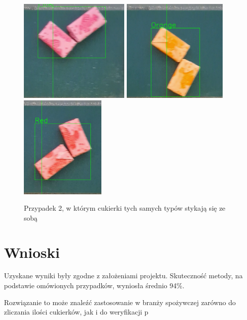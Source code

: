 \documentclass{article}
\begin{document}
\begin{center}
\begin{figure}[H]
\includegraphics[height=5cm]{pink.png}
\includegraphics[height=5cm]{orange.png}
\includegraphics[height=5cm]{red.png}
\caption{Przypadek 2, w którym cukierki tych samych typów stykają się ze sobą}
\end{figure}
\end{center}

\section{Wnioski}
\label{Wnioski}

Uzyskane wyniki były zgodne z założeniami projektu. Skuteczność metody, na podstawie omówionych przypadków, wyniosła średnio 94\%.

Rozwiązanie to może znaleźć zastosowanie w branży spożywczej zarówno do zliczania ilości cukierków, jak i do weryfikacji p
\end{document}
